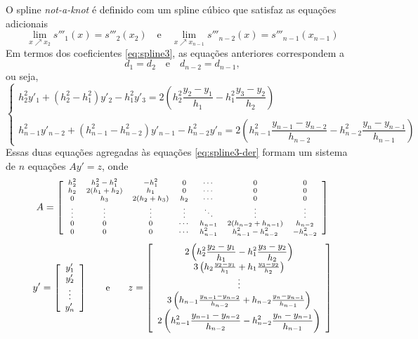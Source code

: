 O spline \textit{not-a-knot} é definido com um spline cúbico que satisfaz as equações adicionais
\begin{equation*}
	\lim\limits_{x\nearrow x_2 }s'''_1(x)=s'''_2(x_2)\quad\text{e}\quad	\lim\limits_{x\nearrow x_{n-1} }s'''_{n-2}(x)=s'''_{n-1}(x_{n-1})
\end{equation*}
Em termos dos coeficientes \eqref{eq:spline3}, as equações anteriores correspondem a 
\begin{equation*}
	d_1=d_2\quad\text{e}\quad d_{n-2}=d_{n-1},
\end{equation*}
ou seja,
\begin{equation*}
\left\{\begin{array}{l}
	h_2^2y'_1+(h_2^2-h_1^2)y'_2-h_1^2y'_3=2\left(h_2^2\dfrac{y_2-y_1}{h_1}-h_1^2\dfrac{y_3-y_2}{h_2}\right)\\
	\\
	h_{n-1}^2y'_{n-2}+(h_{n-1}^2-h_{n-2}^2)y'_{n-1}-h_{n-2}^2y'_n=2\left(h_{n-1}^2\dfrac{y_{n-1}-y_{n-2}}{h_{n-2}}-h_{n-2}^2\dfrac{y_n-y_{n-1}}{h_{n-1}}\right)
	\end{array}\right.
\end{equation*}
Essas duas equações agregadas às equações \eqref{eq:spline3-der} formam um sistema de $n$ equações $Ay' = z$, onde
\begin{equation*}
	\begin{scriptsize}
		A=\left[\begin{array}{ccccccc}
			h_2^2&h_2^2-h_1^2&-h_1^2&0&\cdots&0&0\\
			h_2&2(h_1+h_2)&h_1&0&\cdots&0&0\\
			0&h_3&2(h_2+h_3)&h_2&\cdots&0&0\\
			\vdots&\vdots&\vdots&\vdots&\ddots&\vdots&\vdots\\
			0&0&0&\cdots&h_{n-1} & 2(h_{n-2}+h_{n-1})&h_{n-2}\\
			0&0&0&\cdots &h_{n-1}^2&h_{n-1}^2-h_{n-2}^2&-h_{n-2}^2
		\end{array}\right] 
	\end{scriptsize} 
\end{equation*}
\begin{equation*}
	\begin{small}
		y'= \left[\begin{array}{c}
			y'_1\\
			y'_2\\
			\vdots\\
			y'_n
		\end{array}\right]\qquad \hbox{e}\qquad
		z = \left[\begin{array}{c}
			2\left(h_2^2\dfrac{y_2-y_1}{h_1}-h_1^2\dfrac{y_3-y_2}{h_2}\right)\\
			3\left(h_2\frac{y_2-y_1}{h_1}+h_1\frac{y_3-y_2}{h_2}\right)\\
			\vdots\\
			3\left(h_{n-1}\frac{y_{n-1}-y_{n-2}}{h_{n-2}}+h_{n-2}\frac{y_n-y_{n-1}}{h_{n-1}}\right)\\
			2\left(h_{n-1}^2\dfrac{y_{n-1}-y_{n-2}}{h_{n-2}}-h_{n-2}^2\dfrac{y_n-y_{n-1}}{h_{n-1}}\right)\\
		\end{array}\right]
	\end{small}
\end{equation*}
